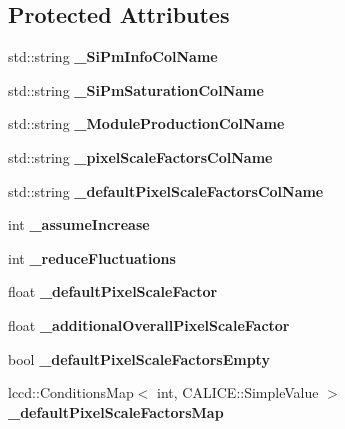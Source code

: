 \subsection*{Protected Attributes}
\begin{DoxyCompactItemize}
\item 
std::string {\bfseries \_\-SiPmInfoColName}\label{classCALICE_1_1SiPmPropertiesProcessor_acb6749fb1dcb670ca6206a0fc5478196}

\item 
std::string {\bfseries \_\-SiPmSaturationColName}\label{classCALICE_1_1SiPmPropertiesProcessor_a66c56f04af769b028268647ddeffe705}

\item 
std::string {\bfseries \_\-ModuleProductionColName}\label{classCALICE_1_1SiPmPropertiesProcessor_a46c6cf33232fba705301d00d02088adc}

\item 
std::string {\bfseries \_\-pixelScaleFactorsColName}\label{classCALICE_1_1SiPmPropertiesProcessor_a2ef504d7d9c26e1303b99de4da217a41}

\item 
std::string {\bfseries \_\-defaultPixelScaleFactorsColName}\label{classCALICE_1_1SiPmPropertiesProcessor_a19a7832e60bdff54a927cbbc53b1cca4}

\item 
int {\bfseries \_\-assumeIncrease}\label{classCALICE_1_1SiPmPropertiesProcessor_a506a0e660344a9b36912b6eae69b6f94}

\item 
int {\bfseries \_\-reduceFluctuations}\label{classCALICE_1_1SiPmPropertiesProcessor_ac5cc7412d5336f3f2e911b2aaf212649}

\item 
float {\bfseries \_\-defaultPixelScaleFactor}\label{classCALICE_1_1SiPmPropertiesProcessor_a90bcbbe027b24839e1968c9b84a555af}

\item 
float {\bfseries \_\-additionalOverallPixelScaleFactor}\label{classCALICE_1_1SiPmPropertiesProcessor_afad2b42ffbb0391e63a263686e6f5f94}

\item 
bool {\bfseries \_\-defaultPixelScaleFactorsEmpty}\label{classCALICE_1_1SiPmPropertiesProcessor_aad80ef59255bbbacf9d31637d642b045}

\item 
lccd::ConditionsMap$<$ int, CALICE::SimpleValue $>$ {\bfseries \_\-defaultPixelScaleFactorsMap}\label{classCALICE_1_1SiPmPropertiesProcessor_ab881fc07e0db31700f84de9a851d4070}


\end{DoxyCompactItemize}
